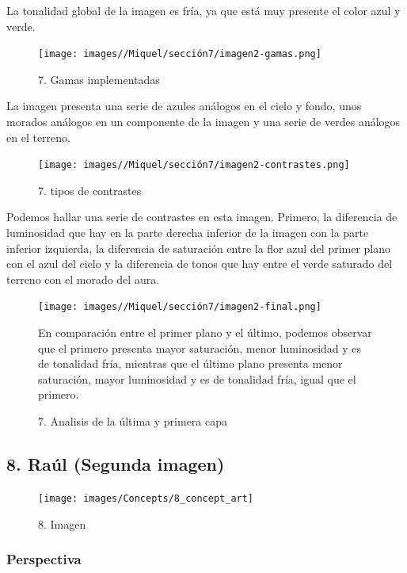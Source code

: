 \documentclass[12pt]{article}
\begin{document}
     La tonalidad global de la imagen es fría, ya que está muy presente el color azul y verde.   

\begin{figure}[H]
      \centering
      \texttt{[image: images//Miquel/sección7/imagen2-gamas.png]}
      \caption{\small 7. Gamas implementadas}
    \end{figure}
  
    La imagen presenta una serie de azules análogos en el cielo y fondo, unos morados análogos en un componente de la imagen y una serie de verdes análogos en el terreno.

\begin{figure}[H]
      \centering
      \texttt{[image: images//Miquel/sección7/imagen2-contrastes.png]}
      \caption{\small 7. tipos de contrastes}
    \end{figure}
    
    Podemos hallar una serie de contrastes en esta imagen. Primero, la diferencia de luminosidad que hay en la parte derecha inferior de la imagen con la parte inferior izquierda, la diferencia de saturación entre la flor azul del primer plano con el azul del cielo  y la diferencia de tonos que hay entre el verde saturado del terreno con el morado del aura.

    \begin{figure}[H]
      \centering
      \texttt{[image: images//Miquel/sección7/imagen2-final.png]}
      \caption{\small 7. Analisis de la última y primera capa}

    En comparación entre el primer plano y el último, podemos observar que el primero presenta mayor saturación, menor luminosidad y es de tonalidad fría, mientras que el último plano presenta menor saturación, mayor luminosidad y es de tonalidad fría, igual que el primero.


    \end{figure}

    \subsection{8. Raúl (Segunda imagen)}
    \begin{figure}[H]
      \centering
      \texttt{[image: images/Concepts/8\_concept\_art]}
      \caption{\small 8. Imagen}
    \end{figure}

        \subsubsection{Perspectiva}
\end{document}
